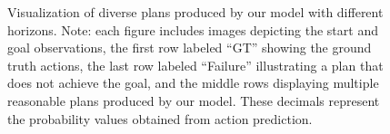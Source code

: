 
\begin{figure}[htbp]
    \centering
    
    \vspace{1em}
    
    
    \vspace{1em}
    
    
    \vspace{1em}
    
    
    \caption{Visualization of diverse plans produced by our model with different horizons. Note: each figure includes images depicting the start and goal observations, the first row labeled ``GT'' showing the ground truth actions, the last row labeled ``Failure'' illustrating a plan that does not achieve the goal, and the middle rows displaying multiple reasonable plans produced by our model. These decimals represent the probability values obtained from action prediction. }
    \label{fig:visual-all}
\end{figure}